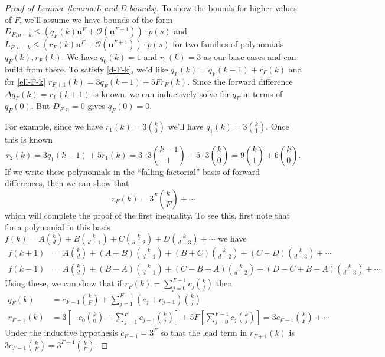 \documentclass[3p, authoryear, square]{elsarticle}
\theoremstyle{definition}
\newcommand{\bigO}[1]{\mathcal{O}\left(#1\right)}
\newcommand{\mach}{\mathbf{u}}
\begin{document}
\begin{proof}[Proof of Lemma~\ref{lemma:L-and-D-bounds}]
To show the bounds for higher values of \(F\), we'll assume we have
bounds of the form
\(D_{F, n - k} \leq \left(q_F(k) \mach^F + \bigO{\mach^{F + 1}}\right) \cdot
\widetilde{p}(s)\) and
\(L_{F, n - k} \leq \left(r_F(k) \mach^F + \bigO{\mach^{F + 1}}\right) \cdot
\widetilde{p}(s)\) for two families of polynomials \(q_F(k), r_F(k)\). We
have \(q_0(k) = 1\) and \(r_1(k) = 3\) as our base cases and can build from
there. To satisfy \eqref{d-F-k}, we'd like
\(q_F(k) = q_F(k - 1) + r_F(k)\)
and for \eqref{ell-F-k}
\(r_{F + 1}(k) = 3 q_F(k - 1) + 5 F r_F(k)\).
Since the forward difference \(\Delta q_F(k) = r_F(k + 1)\) is known,
we can inductively solve for \(q_F\) in terms of \(q_F(0)\). But
\(D_{F, n} = 0\) gives \(q_F(0) = 0\).

For example, since we have \(r_1(k) = 3 \binom{k}{0}\) we'll have
\(q_1(k) = 3 \binom{k}{1}\). Once this is known
\begin{equation}
r_2(k) = 3 q_1(k - 1) + 5 r_1(k) = 3 \cdot 3 \binom{k - 1}{1} +
5 \cdot 3 \binom{k}{0} = 9 \binom{k}{1} + 6 \binom{k}{0}.
\end{equation}
If we write these polynomials in the ``falling factorial'' basis of
forward differences, then we can show that
\begin{equation}
r_F(k) = 3^F \binom{k}{F} + \cdots
\end{equation}
which will complete the proof of the first inequality. To see this, first
note that for a polynomial in this basis
\(f(k) = A \binom{k}{d} + B \binom{k}{d - 1} + C \binom{k}{d - 2} +
D \binom{k}{d - 3} + \cdots\) we have
\begin{align}
f(k + 1) &= A \binom{k}{d} + (A + B) \binom{k}{d - 1} +
  (B + C) \binom{k}{d - 2} + (C + D) \binom{k}{d - 3} + \cdots \\
f(k - 1) &= A \binom{k}{d} + (B - A) \binom{k}{d - 1} +
  (C - B + A) \binom{k}{d - 2} + (D - C + B - A) \binom{k}{d - 3} + \cdots
\end{align}
Using these, we can show that if
\(r_F(k) = \sum_{j = 0}^{F - 1} c_j \binom{k}{j}\) then
\begin{align}
q_F(k) &= c_{F - 1} \binom{k}{F} + \sum_{j = 1}^{F - 1}
  (c_j + c_{j - 1}) \binom{k}{j} \\
r_{F + 1}(k) &= 3 \left[-c_0 \binom{k}{0} +
  \sum_{j = 1}^F c_{j - 1} \binom{k}{j}\right] +
5F \left[\sum_{j = 0}^{F - 1} c_j \binom{k}{j}\right] =
3 c_{F - 1} \binom{k}{F} + \cdots
\end{align}
Under the inductive hypothesis \(c_{F - 1} = 3^F\) so that
the lead term in \(r_{F + 1}(k)\) is \(3 c_{F - 1} \binom{k}{F}
= 3^{F + 1} \binom{k}{F}\).


\end{proof}
\end{document}
